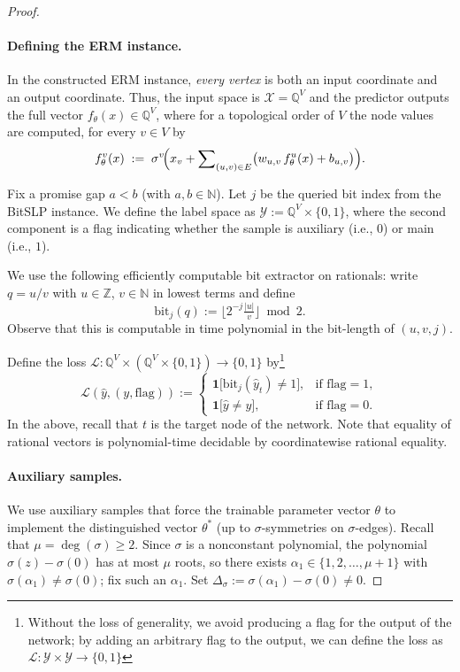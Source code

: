 \documentclass{article}
\newcommand{\Q}{\mathbb{Q}}
\newcommand{\Z}{\mathbb{Z}}
\newcommand{\N}{\mathbb{N}}
\newcommand{\cL}{\mathcal{L}}
\newcommand{\cX}{\mathcal{X}}
\newcommand{\cY}{\mathcal{Y}}
\theoremstyle{plain}
\theoremstyle{definition}
\theoremstyle{remark}
\begin{document}
\begin{proof}
	
	\paragraph{Defining the ERM instance.}
	In the constructed ERM instance, \emph{every vertex} is both an input coordinate and an output coordinate.
	Thus, the input space is $\cX=\Q^{V}$ and the predictor outputs the full vector
	$f_\theta(x)\in\Q^{V}$, where for a topological order of $V$ the node values are computed, for every $v \in V$ by
	\begin{equation}
		\label{eq:node-rule}
		f^v_\theta(x)
		\;:=\;
		\sigma^v\!\Bigl(x_v + \sum\nolimits_{(u,v)\in E}\bigl(w_{u,v}\,f^u_\theta(x)+b_{u,v}\bigr)\Bigr).
	\end{equation}
	
	\smallskip
	Fix a promise gap $a<b$ (with $a,b\in\N$). %
	Let $j$ be the queried bit index from the BitSLP instance.
	We define the label space as $\cY:=\Q^{V}\times\{0,1\}$, where the second component is a flag indicating whether the sample is auxiliary (i.e., $0$) or main (i.e., $1$).
	
	\smallskip
	We use the following efficiently computable bit extractor on rationals:
	write $q=u/v$ with $u\in\Z$, $v\in\N$ in lowest terms and define
	\[
	\mathrm{bit}_j(q):=\Big\lfloor 2^{-j}\tfrac{|u|}{v}\Big\rfloor \bmod 2.
	\]
	Observe that this is computable in time polynomial in the bit-length of $(u,v,j)$.
	
	\smallskip
	Define the loss $\cL:\Q^{V}\times(\Q^{V}\times\{0,1\})\to\{0,1\}$ by\footnote{Without the loss of generality, we avoid producing a flag for the output of the network; by adding an arbitrary flag to the output, we can define the loss as $\cL:\cY \times \cY \to\{0,1\}$}
	\[
	\cL(\hat y,(y,\mathrm{flag})) :=
	\begin{cases}
		\mathbf{1}\bigl[\mathrm{bit}_j(\hat y_t)\neq 1\bigr], & \text{if }\mathrm{flag}=1,\\[1mm]
		\mathbf{1}\bigl[\hat y\neq y\bigr], & \text{if }\mathrm{flag}=0.
	\end{cases}
	\]
	In the above, recall that $t$ is the target node of the network. Note that equality of rational vectors is polynomial-time decidable by coordinatewise rational equality.
	


\paragraph{Auxiliary samples.}
We use auxiliary samples that force the trainable parameter vector $\theta$ to implement the distinguished vector $\theta^\ast$
(up to $\sigma$-symmetries on $\sigma$-edges).
Recall that $\mu=\deg(\sigma)\ge 2$.
Since $\sigma$ is a nonconstant polynomial, the polynomial $\sigma(z)-\sigma(0)$ has at most $\mu$ roots,
so there exists $\alpha_1\in\{1,2,\dots,\mu+1\}$ with $\sigma(\alpha_1)\neq\sigma(0)$; fix such an $\alpha_1$.
Set $\Delta_\sigma:=\sigma(\alpha_1)-\sigma(0)\neq 0$.


\end{proof}
\end{document}
